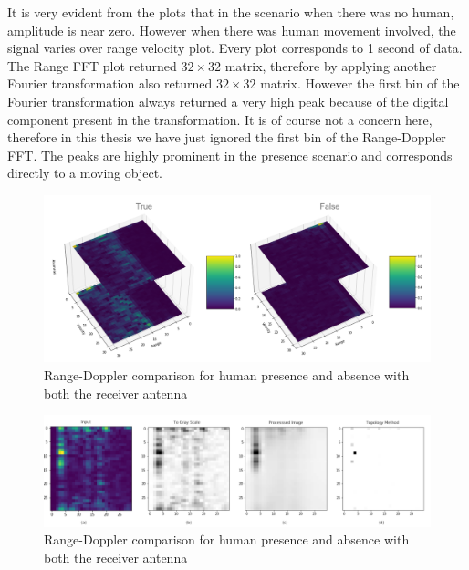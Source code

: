 It is very evident from the plots that in the scenario when there was no human, amplitude is near zero. However when there was human movement involved, the signal varies over range velocity plot. Every plot corresponds to 1 second of data. The Range FFT plot returned $32\times32$ matrix, therefore by applying another Fourier transformation also returned $32\times32$ matrix. However the first bin of the Fourier transformation always returned a very high peak because of the digital component present in the transformation. It is of course not a concern here, therefore in this thesis we have just ignored the first bin of the Range-Doppler FFT. The peaks are highly prominent in the presence scenario and corresponds directly to a moving object.

\begin{figure}[ht]
  \begin{center}
    \includegraphics[width=1\textwidth]{Master's thesis/images/4d_rdfft.PNG}
     \caption{Range-Doppler comparison for human presence  and  absence  with both the receiver antenna}
    \label{fig:rdFFT_4d2a}
  \end{center}
\end{figure} 
\begin{figure}[ht]
  \begin{center}
    \includegraphics[width=1.1\textwidth]{Master's thesis/images/cleaning_rd.PNG}
     \caption{Range-Doppler comparison for human presence  and  absence  with both the receiver antenna}
    \label{fig:cleaning}
  \end{center}
\end{figure} 

